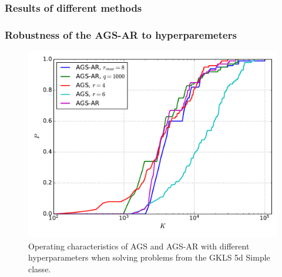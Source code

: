 \documentclass[aspectratio=1610]{beamer}
\begin{document}
\begin{frame}
  \frametitle{Results of different methods}
  \begin{figure}[ht]
    \centering
  \end{figure}
\end{frame}

\begin{frame}
  \frametitle{Robustness of the AGS-AR to hyperparemeters}
  \begin{figure}[ht]
    \centering
    \includegraphics[width=.6\textwidth]{ar_stab.pdf}
    \caption{Operating characteristics of AGS and AGS-AR with different hyperparameters
    when solving problems from the GKLS 5d Simple classe.}
    \label{fig:stability}
  \end{figure}
\end{frame}
\end{document}
